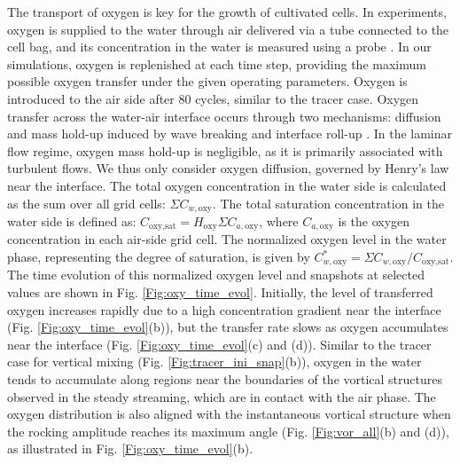 \documentclass[final,3p,times,twocolumn,authoryear]{elsarticle}
\theoremstyle{definition}
\begin{document}
The transport of oxygen is key for the growth of cultivated cells. In experiments, oxygen is supplied to the water through air delivered via a tube connected to the cell bag, and its concentration in the water is measured using a probe \citep{Junne2013,Bai2019a}. In our simulations, oxygen is replenished at each time step, providing the maximum possible oxygen transfer under the given operating parameters. Oxygen is introduced to the air side after 80 cycles, similar to the tracer case. Oxygen transfer across the water-air interface occurs through two mechanisms: diffusion and mass hold-up induced by wave breaking and interface roll-up \citep{Bai2019b}. In the laminar flow regime, oxygen mass hold-up is negligible, as it is primarily associated with turbulent flows. We thus only consider oxygen diffusion, governed by Henry's law near the interface. The total oxygen concentration in the water side is calculated as the sum over all grid cells: $\Sigma C_{w,\textrm{oxy}}$. The total saturation concentration in the water side is defined as: $C_\textrm{oxy,sat}=H_{\textrm{oxy}}\Sigma C_{a,\textrm{oxy}}$, where $C_{a,\textrm{oxy}}$ is the oxygen concentration in each air-side grid cell. The normalized oxygen level in the water phase, representing the degree of saturation, is given by $C_{w,\textrm{oxy}}^* = \Sigma C_{w,\textrm{oxy}}/C_{\textrm{oxy,sat}}$. The time evolution of this normalized oxygen level and snapshots at selected values are shown in Fig. \ref{Fig:oxy_time_evol}. Initially, the level of transferred oxygen increases rapidly due to a high concentration gradient near the interface (Fig. \ref{Fig:oxy_time_evol}(b)), but the transfer rate slows as oxygen accumulates near the interface (Fig. \ref{Fig:oxy_time_evol}(c) and (d)). Similar to the tracer case for vertical mixing (Fig. \ref{Fig:tracer_ini_snap}(b)), oxygen in the water tends to accumulate along regions near the boundaries of the vortical structures observed in the steady streaming, which are in contact with the air phase. The oxygen distribution is also aligned with the instantaneous vortical structure when the rocking amplitude reaches its maximum angle (Fig. \ref{Fig:vor_all}(b) and (d)), as illustrated in Fig. \ref{Fig:oxy_time_evol}(b).
\end{document}
